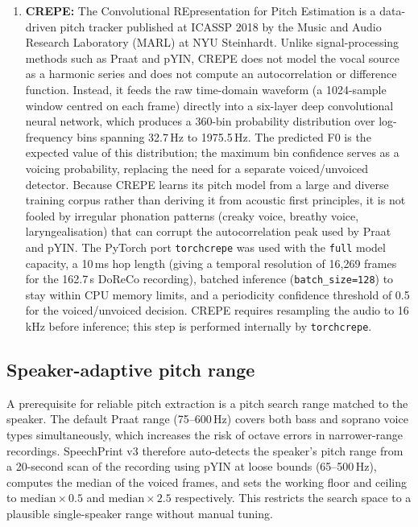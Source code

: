\begin{enumerate}
\item \textbf{CREPE:} The Convolutional REpresentation for Pitch Estimation
      \cite{kim2018crepe} is a data-driven pitch tracker published at ICASSP 2018
      by the Music and Audio Research Laboratory (MARL) at NYU Steinhardt. Unlike
      signal-processing methods such as Praat and pYIN, CREPE does not model the
      vocal source as a harmonic series and does not compute an autocorrelation or
      difference function. Instead, it feeds the raw time-domain waveform (a
      1024-sample window centred on each frame) directly into a six-layer deep
      convolutional neural network, which produces a 360-bin probability
      distribution over log-frequency bins spanning 32.7\,Hz to 1975.5\,Hz. The
      predicted F0 is the expected value of this distribution; the maximum bin
      confidence serves as a voicing probability, replacing the need for a
      separate voiced/unvoiced detector. Because CREPE learns its pitch model
      from a large and diverse training corpus rather than deriving it from
      acoustic first principles, it is not fooled by irregular phonation patterns
      (creaky voice, breathy voice, laryngealisation) that can corrupt the
      autocorrelation peak used by Praat and pYIN. The PyTorch port
      \texttt{torchcrepe} \cite{morrisonTorchcrepe} was used with the
      \texttt{full} model capacity, a 10\,ms hop length (giving a temporal
      resolution of 16,269 frames for the 162.7\,s DoReCo recording), batched
      inference (\texttt{batch\_size=128}) to stay within CPU memory limits, and a
      periodicity confidence threshold of 0.5 for the voiced/unvoiced decision.
      CREPE requires resampling the audio to 16\,kHz before inference; this step
      is performed internally by \texttt{torchcrepe}.

\end{enumerate}

\subsection{Speaker-adaptive pitch range}

A prerequisite for reliable pitch extraction is a pitch search range matched to
the speaker. The default Praat range (75--600\,Hz) covers both bass and soprano
voice types simultaneously, which increases the risk of octave errors in
narrower-range recordings. SpeechPrint v3 therefore auto-detects the speaker's
pitch range from a 20-second scan of the recording using pYIN at loose bounds
(65--500\,Hz), computes the median of the voiced frames, and sets the working
floor and ceiling to $\text{median} \times 0.5$ and $\text{median} \times 2.5$
respectively. This restricts the search space to a plausible single-speaker range
without manual tuning.

